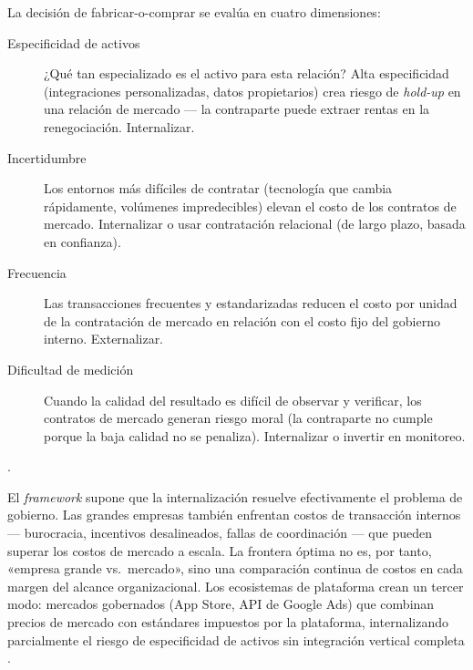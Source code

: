 La decisión de fabricar-o-comprar se evalúa en cuatro dimensiones:
\begin{description}
  \item[Especificidad de activos] ¿Qué tan especializado es el activo para esta relación? Alta
    especificidad (integraciones personalizadas, datos propietarios) crea riesgo de \emph{hold-up}
    en una relación de mercado --- la contraparte puede extraer rentas en la renegociación.
    Internalizar.
  \item[Incertidumbre] Los entornos más difíciles de contratar (tecnología que cambia rápidamente,
    volúmenes impredecibles) elevan el costo de los contratos de mercado. Internalizar o usar
    contratación relacional (de largo plazo, basada en confianza).
  \item[Frecuencia] Las transacciones frecuentes y estandarizadas reducen el costo por unidad de
    la contratación de mercado en relación con el costo fijo del gobierno interno. Externalizar.
  \item[Dificultad de medición] Cuando la calidad del resultado es difícil de observar y verificar,
    los contratos de mercado generan riesgo moral (la contraparte no cumple porque la baja calidad
    no se penaliza). Internalizar o invertir en monitoreo.
\end{description}
\parencite{coase1937nature}.

El \emph{framework} supone que la internalización resuelve efectivamente el problema de gobierno.
Las grandes empresas también enfrentan costos de transacción internos --- burocracia, incentivos
desalineados, fallas de coordinación --- que pueden superar los costos de mercado a escala. La
frontera óptima no es, por tanto, «empresa grande vs.\ mercado», sino una comparación continua de
costos en cada margen del alcance organizacional. Los ecosistemas de plataforma crean un tercer
modo: mercados gobernados (App Store, API de Google Ads) que combinan precios de mercado con
estándares impuestos por la plataforma, internalizando parcialmente el riesgo de especificidad
de activos sin integración vertical completa \parencite{dranove7theconomics}.

